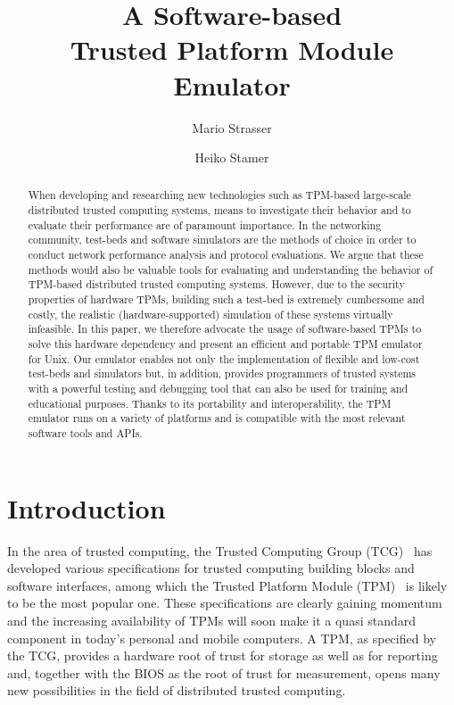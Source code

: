 \documentclass[runningheads]{llncs}
\title{\bf A Software-based\\ Trusted Platform Module Emulator}
\author{Mario Strasser\inst{1} \and Heiko Stamer\inst{2}}
\institute{
	ETH Zurich, Switzerland\\
	\email{strasser@tik.ee.ethz.ch}\\[3mm]
\and
	Fachbereich Elektrotechnik/Informatik, Universit\"at Kassel\\
	34109 Kassel, Germany\\
	\email{stamer@theory.informatik.uni-kassel.de}\\
}
\date{}
\begin{document}
\maketitle

\begin{abstract}
	When developing and researching new technologies such as TPM-based
	large-scale distributed trusted computing systems, means to investigate
	their behavior and to evaluate their performance are of paramount
	importance. In the networking community, test-beds and software simulators
	are the methods of choice in order to conduct network performance analysis
	and protocol evaluations. We argue that these methods would also be valuable
	tools for evaluating and understanding the behavior of TPM-based distributed
	trusted computing systems. However, due to the security properties of hardware
	TPMs, building such a test-bed is extremely cumbersome and costly, the
	realistic (hardware-supported) simulation of these systems virtually
	infeasible. In this paper, we therefore advocate the usage of software-based
	TPMs to solve this hardware dependency and present an efficient and portable
	TPM emulator for Unix. Our emulator enables not only the implementation of
	flexible and low-cost test-beds and simulators but, in addition, provides
	programmers of trusted systems with a powerful testing and debugging tool
	that can also be used for training and educational purposes. Thanks to its
	portability and interoperability, the TPM emulator runs on a variety of
	platforms and is compatible with the most relevant software tools and APIs.
\end{abstract}


\section{Introduction}
In the area of trusted computing, the Trusted Computing Group (TCG)~\cite{TCG} has developed
various specifications for trusted computing building blocks and software interfaces, among which
the Trusted Platform Module (TPM)~\cite{TCGSpec} is likely to be the most popular one. These
specifications are clearly gaining momentum and the increasing availability of TPMs will soon make
it a quasi standard component in today's personal and mobile computers. A TPM, as specified by the
TCG, provides a hardware root of trust for storage as well as for reporting and, together with
the BIOS as the root of trust for measurement, opens many new possibilities in the field of
distributed trusted computing.
\end{document}
